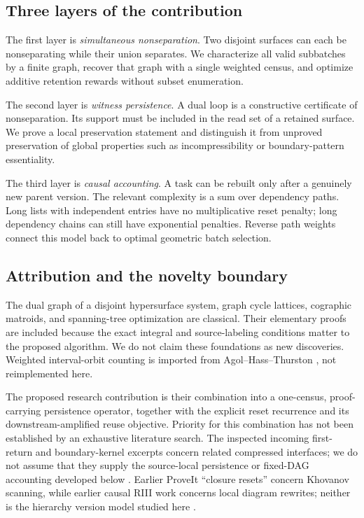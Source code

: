 \documentclass[11pt]{article}
\theoremstyle{definition}
\begin{document}
\subsection{Three layers of the contribution}
The first layer is \emph{simultaneous nonseparation}. Two disjoint surfaces can each be nonseparating while their union separates. We characterize all valid subbatches by a finite graph, recover that graph with a single weighted census, and optimize additive retention rewards without subset enumeration.

The second layer is \emph{witness persistence}. A dual loop is a constructive certificate of nonseparation. Its support must be included in the read set of a retained surface. We prove a local preservation statement and distinguish it from unproved preservation of global properties such as incompressibility or boundary-pattern essentiality.

The third layer is \emph{causal accounting}. A task can be rebuilt only after a genuinely new parent version. The relevant complexity is a sum over dependency paths. Long lists with independent entries have no multiplicative reset penalty; long dependency chains can still have exponential penalties. Reverse path weights connect this model back to optimal geometric batch selection.

\subsection{Attribution and the novelty boundary}
The dual graph of a disjoint hypersurface system, graph cycle lattices, cographic matroids, and spanning-tree optimization are classical. Their elementary proofs are included because the exact integral and source-labeling conditions matter to the proposed algorithm. We do not claim these foundations as new discoveries. Weighted interval-orbit counting is imported from Agol--Hass--Thurston \cite[Theorem~16]{aht}, not reimplemented here.

The proposed research contribution is their combination into a one-census, proof-carrying persistence operator, together with the explicit reset recurrence and its downstream-amplified reuse objective. Priority for this combination has not been established by an exhaustive literature search. The inspected incoming first-return and boundary-kernel excerpts concern related compressed interfaces; we do not assume that they supply the source-local persistence or fixed-DAG accounting developed below \cite{moment,corners,sparse}. Earlier ProveIt ``closure resets'' concern Khovanov scanning, while earlier causal RIII work concerns local diagram rewrites; neither is the hierarchy version model studied here \cite{closures,causalr3}.
\end{document}
